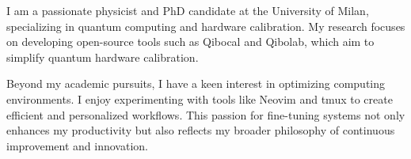 \documentclass[9pt]{developercv} %
\begin{document}


I am a passionate physicist and PhD candidate at the University of Milan, 
specializing in quantum computing and hardware calibration.
My research focuses on developing open-source tools such as Qibocal 
and Qibolab, which aim to simplify quantum hardware calibration.

Beyond my academic pursuits, I have a keen interest in optimizing computing environments.
I enjoy experimenting with tools like Neovim and tmux to create efficient and
personalized workflows. 
This passion for fine-tuning systems not only enhances my productivity but also
reflects my broader philosophy of continuous improvement and innovation.

	
	

\end{document}
